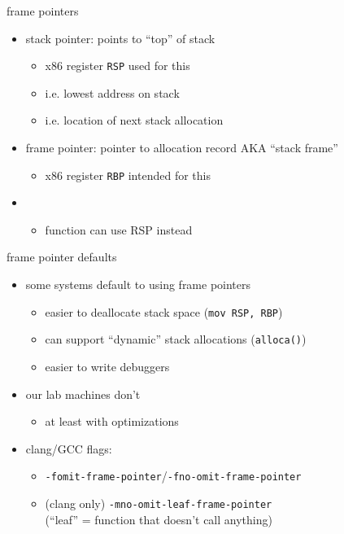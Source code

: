 \begin{frame}{frame pointers}
    \begin{itemize}
    \item stack pointer: points to ``top'' of stack
        \begin{itemize}
        \item x86 register \texttt{RSP} used for this
        \item i.e. lowest address on stack
        \item i.e. location of next stack allocation
        \end{itemize}
    \item frame pointer: pointer to allocation record AKA ``stack frame''
        \begin{itemize}
        \item x86 register \texttt{RBP} intended for this
        \end{itemize}
    \item {}
        \begin{itemize}
        \item function can use RSP instead
        \end{itemize}
    \end{itemize}
\end{frame}

\begin{frame}{frame pointer defaults}
    \begin{itemize}
    \item some systems default to using frame pointers
        \begin{itemize}
        \item easier to deallocate stack space ({\tt mov RSP, RBP})
        \item can support ``dynamic'' stack allocations (\texttt{alloca()})
        \item easier to write debuggers
        \end{itemize}
    \item our lab machines don't
        \begin{itemize}
        \item at least with optimizations
        \end{itemize}
    \item clang/GCC flags:
        \begin{itemize}
            \item {\tt-fomit-frame-pointer}/{\tt-fno-omit-frame-pointer}
            \item (clang only) {\tt-mno-omit-leaf-frame-pointer} \\
                (``leaf'' = function that doesn't call anything)
        \end{itemize}
    \end{itemize}
\end{frame}

